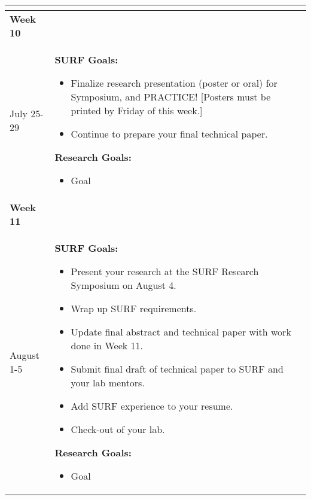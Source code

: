\documentclass[a4paper]{journal}
\begin{document}
\begin{longtable}{| m{} | p{}|}
\begin{itemize}
                                    \end{itemize}\\
  \hline
  \textbf{Week 10} & \\ July 25-29 &  \textbf{SURF Goals:}
                                    \begin{itemize}
                                      \item Finalize research presentation (poster or oral) for Symposium, and PRACTICE! [Posters must be printed by Friday of this week.]
                                      \item Continue to prepare your final technical paper.
                                    \end{itemize}
                                    \textbf{Research Goals:}
                                    \begin{itemize}
                                      \item Goal
                                    \end{itemize}\\
  \hline
  \textbf{Week 11} & \\ August 1-5 &  \textbf{SURF Goals:}
                                    \begin{itemize}
                                      \item Present your research at the SURF Research Symposium on August 4.
                                      \item Wrap up SURF requirements.
                                      \item Update final abstract and technical paper with work done in Week 11.
                                      \item Submit final draft of technical paper to SURF and your lab mentors.
                                      \item Add SURF experience to your resume.
                                      \item Check-out of your lab.
                                    \end{itemize}
                                    \textbf{Research Goals:}
                                    \begin{itemize}
                                      \item Goal
                                    \end{itemize}\\
  \hline
\end{longtable}
\end{document}
